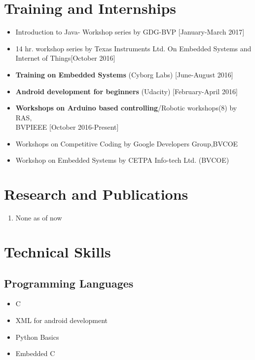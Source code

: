 \documentclass[11pt]{article}
\begin{document}
\begin{minipage}{0.80\linewidth}
\section{\color{pink}Tra\color{black}ining and Internships}
\begin{itemize}
\item Introduction to Java- Workshop series by GDG-BVP [January-March 2017]
\item 14 hr. workshop series by Texas Instruments Ltd. On Embedded Systems and\\ Internet of Things[October 2016]
\item \textbf{Training on Embedded Systems} (Cyborg Labs) [June-August 2016]
\item \textbf{Android development for beginners} (Udacity) [February-April 2016]
\item \textbf{Workshops on Arduino based controlling}/Robotic workshops(8) by RAS,\\ BVPIEEE [October 2016-Present]
\item Workshops on Competitive Coding by Google Developers Group,BVCOE
\item Workshop on Embedded Systems by CETPA Info-tech Ltd. (BVCOE)
\end{itemize}

\section{\color{blue}Res\color{black}earch and Publications}
\begin{enumerate}
\item None as of now
\end{enumerate}

\section{\color{cyan}Tec\color{black}hnical Skills}
\subsection{Programming Languages}
\begin{itemize}
\item C
\item XML for android development
\item Python Basics
\item Embedded C
\end{itemize}
\end{minipage}
\begin{minipage}{0.20\linewidth}
~\\
\end{minipage}
\end{document}

